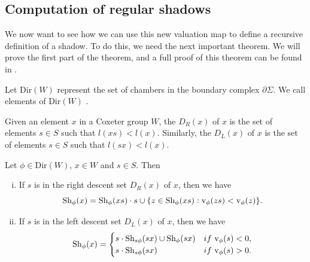 \documentclass[11pt]{article}
\begin{document}






\subsection{Computation of regular shadows}

We now want to see how we can use this new valuation map to define a recursive definition of a shadow. To do this, we need the next important theorem. We will prove the first part of the theorem, and a full proof of this theorem can be found in \cite[pp.142-143]{SHA}. 

Let Dir$(W)$ represent the set of chambers in the boundary complex $\partial\Sigma$. We call elements of Dir$(W)$ . 

\begin{definition}
    Given an element $x$ in a Coxeter group $W$, the  $D_R(x)$ of $x$ is the set of elements $s\in S$ such that $l(xs)<l(x)$. Similarly, the  $D_L(x)$ of $x$ is the set of elements $s\in S$ such that $l(sx)<l(x)$.
\end{definition}
\newpage
\begin{theorem} \label{alg}
    Let $\phi\in$Dir$(W)$, $x\in W$ and $s\in S$. Then
    \begin{enumerate}[(i)]
        \item If $s$ is in the right descent set $D_R(x)$ of $x$, then we have
        \[\textnormal{Sh}_\phi(x)=\textnormal{Sh}_\phi(xs)\cdot s \cup \{z\in \textnormal{Sh}_\phi(xs):\textnormal{v}_\phi(zs)<\textnormal{v}_\phi(z)\}.\]
        \item If $s$ is in the left descent set $D_L(x)$ of $x$, then we have
        \[\textnormal{Sh}_\phi(x)=\begin{cases}
            s\cdot \textnormal{Sh}_{s\phi}(sx)\cup \textnormal{Sh}_\phi(sx) &if\textnormal{ v}_\phi(s)<0,\\
            s\cdot \textnormal{Sh}_{s\phi}(sx) &if \textnormal{ v}_\phi(s)>0.\\
        \end{cases}\]
    \end{enumerate}
\end{theorem}
\end{document}
